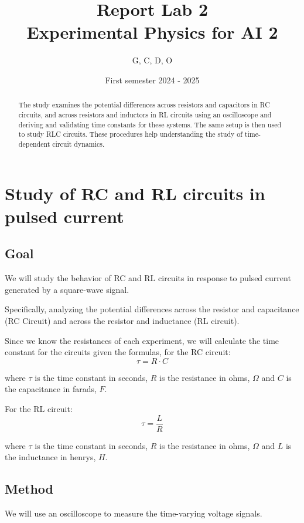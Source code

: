 \documentclass[notitlepage]{report}
\title{Report Lab 2\\\small Experimental Physics for AI 2}
\author{G, C, D, O}
\date{First semester 2024 \-- 2025}
\numberwithin{equation}{section}
\theoremstyle{plain}
\theoremstyle{definition}
\theoremstyle{remark}
\begin{document}
\maketitle

\begin{abstract}
The study examines the potential differences across resistors and capacitors in
RC circuits, and across resistors and inductors in RL circuits using an
oscilloscope and deriving and validating time constants for these systems. The
same setup is then used to study RLC circuits. These
procedures help understanding the study of time-dependent circuit dynamics.
\end{abstract}

\chapter{Study of RC and RL circuits in pulsed current }

\section{Goal}
We will study the behavior of RC and RL circuits in response to pulsed current generated by a square-wave signal. 

Specifically, analyzing the potential differences across the resistor and capacitance (RC Circuit) and across the resistor and inductance (RL circuit). 

Since we know the resistances of each experiment, we will calculate the time constant for the circuits given the formulas, for the RC circuit:
\[
\tau = R \cdot C
\]

where \( \tau \) is the time constant in seconds,  \( R \) is the resistance in ohms, \( \Omega \) and \( C \) is the capacitance in farads, \( F \).



For the RL circuit:
\[
\tau = \frac{L}{R}
\]

where \( \tau \) is the time constant in seconds,  \( R \) is the resistance in ohms, \( \Omega \) and \( L \) is the inductance in henrys, \( H \).

\section{Method}
We will use an oscilloscope to measure the time-varying voltage signals. 
\end{document}

